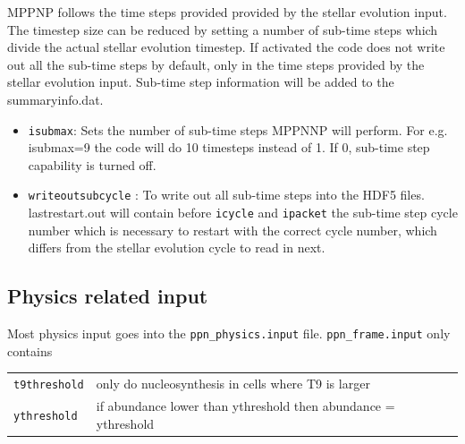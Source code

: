 MPPNP follows the time steps provided provided by the stellar evolution
input. The timestep size can be reduced by setting a number of sub-time steps
which divide the actual stellar evolution timestep. If activated
the code does not write out all the sub-time steps by default, only in the time steps
provided by the stellar evolution input. Sub-time step information will be added to
the summaryinfo.dat.



\begin{itemize}

\item \texttt{isubmax}: Sets the number of sub-time steps MPPNNP will perform.
					  For e.g. isubmax=9 the code will do 10 timesteps instead
					  of 1. If 0, sub-time step capability is turned off.
		
\item \texttt{writeoutsubcycle} : To write out all sub-time steps
							    into the HDF5 files. last\textunderscore restart.out will
								contain before \texttt{icycle} and \texttt{ipacket}
								the sub-time step cycle number which is necessary
								to restart with the correct cycle number, which differs
								from the stellar evolution cycle to read in next.
\end{itemize}
 
 
 
\subsection{Physics related input}
Most physics input goes into the \texttt{ppn\_physics.input} file. 
\texttt{ppn\_frame.input} only contains \\
\begin{tabularx}{0.9\textwidth}{lX}
  \texttt{t9threshold} & only do nucleosynthesis in cells where T9 is larger \\
  \texttt{ythreshold}  & if abundance lower than ythreshold then abundance = ythreshold
\end{tabularx}




